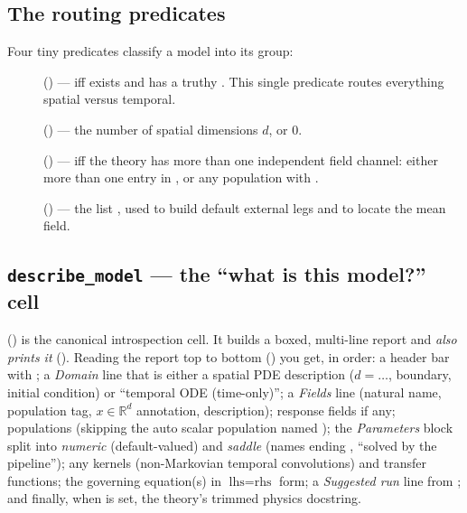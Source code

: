 \subsection{The routing predicates}

Four tiny predicates classify a model into its group:

\begin{description}
  \item[] () ---
         iff  exists and has a truthy
        . This single predicate routes everything spatial versus
        temporal.
  \item[] () ---
        the number of spatial dimensions $d$, or $0$.
  \item[] () ---
         iff the theory has more than one independent field channel:
        either more than one entry in , or any
        population with .
  \item[] ()
        --- the list , used
        to build default external legs and to locate the mean field.
\end{description}

\subsection{\texttt{describe\_model} --- the ``what is this model?'' cell}

() is the canonical introspection cell. It builds
a boxed, multi-line report and \emph{also prints it} ().
Reading the report top to bottom () you get,
in order: a header bar with ; a \emph{Domain} line that is
either a spatial PDE description ($d=\ldots$, boundary, initial condition) or
``temporal ODE (time-only)''; a \emph{Fields} line (natural name, population tag,
$x\in\mathbb{R}^{d}$ annotation, description); response fields if any;
populations (skipping the auto scalar population named ); the
\emph{Parameters} block split into \emph{numeric} (default-valued) and
\emph{saddle} (names ending , ``solved by the pipeline''); any kernels
(non-Markovian temporal convolutions) and transfer functions; the governing
equation(s) in $\text{lhs}=\text{rhs}$ form; a \emph{Suggested run} line from
; and finally, when  is set, the theory's
trimmed physics docstring.

